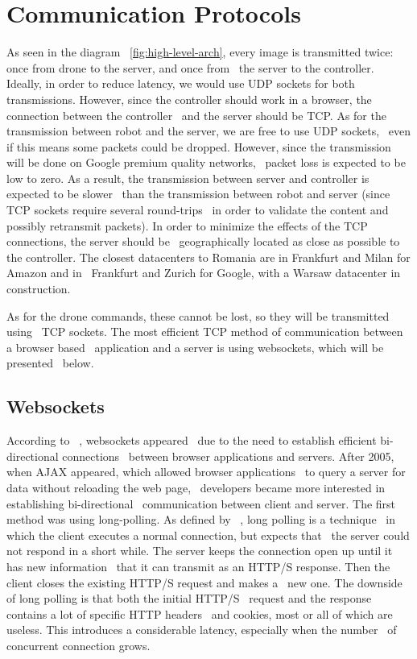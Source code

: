 \section{Communication Protocols}
\label{sec:analysis-comms-protocols}
As seen in the diagram ~\ref{fig:high-level-arch},
every image is transmitted twice: once from drone to the server, and once from \
the server to the controller.
Ideally, in order to reduce latency, we would use UDP sockets for both transmissions.
However, since the controller should work in a browser, the connection between the controller \
and the server should be TCP.
As for the transmission between robot and the server, we are free to use UDP sockets, \
even if this means some packets could be dropped.
However, since the transmission will be done on Google premium quality networks, \
packet loss is expected to be low to zero.
As a result, the transmission between server and controller is expected to be slower \
than the transmission between robot and server (since TCP sockets require several round-trips \
in order to validate the content and possibly retransmit packets).
In order to minimize the effects of the TCP connections, the server should be \
geographically located as close as possible to the controller.
The closest datacenters to Romania are in Frankfurt and Milan for Amazon and in \
Frankfurt and Zurich for Google, with a Warsaw datacenter in construction.

As for the drone commands, these cannot be lost, so they will be transmitted using \
TCP sockets.
The most efficient TCP method of communication between a browser based \
application and a server is using websockets, which will be presented \
below.

\subsection{Websockets}
\label{subsec:analysis-websockets}
According to ~\cite{TeamTreeHouseWebSockets}, websockets appeared \
due to the need to establish efficient bi-directional connections \
between browser applications and servers.
After 2005, when AJAX appeared, which allowed browser applications \
to query a server for data without reloading the web page, \
developers became more interested in establishing bi-directional \
communication between client and server.
The first method was using long-polling.
As defined by ~\cite{WikiLongPolling}, long polling is a technique \
in which the client executes a normal connection, but expects that \
the server could not respond in a short while.
The server keeps the connection open up until it has new information \
that it can transmit as an HTTP/S response.
Then the client closes the existing HTTP/S request and makes a \
new one.
The downside of long polling is that both the initial HTTP/S \
request and the response contains a lot of specific HTTP headers \
and cookies, most or all of which are useless.
This introduces a considerable latency, especially when the number \
of concurrent connection grows.

